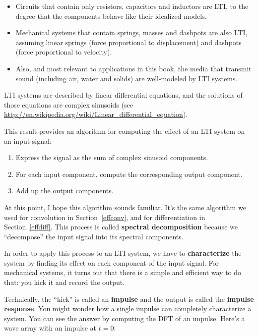 \documentclass[12pt]{book} \usepackage[width=5.5in,height=8.5in, hmarginratio=3:2,vmarginratio=1:1]{geometry}
\begin{document}
\begin{itemize} 

\item Circuits that contain only resistors, capacitors and inductors are LTI, to the degree that the components behave like their idealized models. 

\item Mechanical systems that contain springs, masses and dashpots are also LTI, assuming linear springs (force proportional to displacement) and dashpots (force proportional to velocity). 

\item Also, and most relevant to applications in this book, the media that transmit sound (including air, water and solids) are well-modeled by LTI systems. 

\end{itemize} 

LTI systems are described by linear differential equations, and the solutions of those equations are complex sinusoids (see \url{http://en.wikipedia.org/wiki/Linear_differential_equation}). 

This result provides an algorithm for computing the effect of an LTI system on an input signal: 

\begin{enumerate} 

\item Express the signal as the sum of complex sinusoid components. 

\item For each input component, compute the corresponding output component. 

\item Add up the output components. 

\end{enumerate} 

At this point, I hope this algorithm sounds familiar. It's the same algorithm we used for convolution in Section~\ref{effconv}, and for differentiation in Section~\ref{effdiff}. This process is called {\bf spectral decomposition} because we ``decompose'' the input signal into its spectral components. 

In order to apply this process to an LTI system, we have to {\bf characterize} the system by finding its effect on each component of the input signal. For mechanical systems, it turns out that there is a simple and efficient way to do that: you kick it and record the output. 

Technically, the ``kick'' is called an {\bf impulse} and the output is called the {\bf impulse response}. You might wonder how a single impulse can completely characterize a system. You can see the answer by computing the DFT of an impulse. Here's a wave array with an impulse at $t=0$: 
\end{document}
